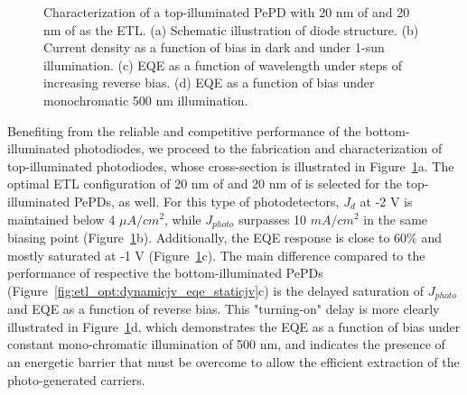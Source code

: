 \begin{figure}[ht!]
    \caption{Characterization of a top-illuminated PePD with 20 nm of  and 20 nm of  as the ETL. (a) Schematic illustration of diode structure. (b) Current density as a function of bias in dark and under 1-sun illumination. (c) EQE as a function of wavelength under steps of increasing reverse bias. (d) EQE as a function of bias under monochromatic 500 nm illumination.}
    \label{fig:pix_pepd:cross_section_performance}
\end{figure}

Benefiting from the reliable and competitive performance of the bottom-illuminated photodiodes, we proceed to the fabrication and characterization of top-illuminated photodiodes, whose cross-section is illustrated in Figure~\ref{fig:pix_pepd:cross_section_performance}a. The optimal ETL configuration of 20 nm of  and 20 nm of  is selected for the top-illuminated PePDs, as well. For this type of photodetectors, $J_d$ at -2 V is maintained below 4 $\mu A/cm^2$, while $J_{photo}$ surpasses 10 $mA/cm^2$ in the same biasing point (Figure~\ref{fig:pix_pepd:cross_section_performance}b). Additionally, the EQE response is close to 60\% and mostly saturated at -1 V (Figure~\ref{fig:pix_pepd:cross_section_performance}c). The main difference compared to the performance of respective the bottom-illuminated PePDs (Figure~\ref{fig:etl_opt:dynamicjv_eqe_staticjv}c) is the delayed saturation of $J_{photo}$ and EQE as a function of reverse bias. This "turning-on" delay is more clearly illustrated in Figure~\ref{fig:pix_pepd:cross_section_performance}d, which demonstrates the EQE as a function of bias under constant mono-chromatic illumination of 500 nm, and indicates the presence of an energetic barrier that must be overcome to allow the efficient extraction of the photo-generated carriers. 

